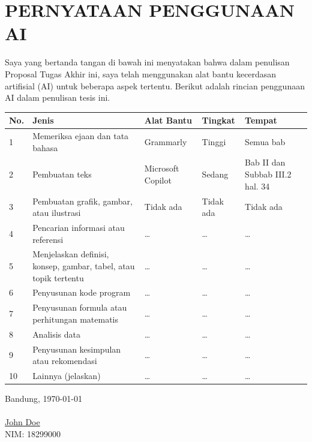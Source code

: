 \chapter*{PERNYATAAN PENGGUNAAN AI}
Saya yang bertanda tangan di bawah ini menyatakan bahwa dalam penulisan Proposal Tugas Akhir ini, saya telah menggunakan alat bantu kecerdasan artifisial (AI) untuk beberapa aspek tertentu. Berikut adalah rincian penggunaan AI dalam penulisan tesis ini.
\begin{table}[h]
\begin{tabular}{|p{0.5cm}| p{4cm} | p{2.5cm} | p{2.5cm} | p{3cm} @{}| }
\hline
\textbf{No.} & \textbf{Jenis} & \textbf{Alat Bantu} & \textbf{Tingkat} & \textbf{Tempat}\\
\hline
1 & Memeriksa ejaan dan tata bahasa & Grammarly & Tinggi & Semua bab \\
\hline
2 & Pembuatan teks & Microsoft Copilot & Sedang & Bab II dan Subbab III.2 hal. 34 \\
\hline
3 & Pembuatan grafik, gambar, atau ilustrasi & Tidak ada & Tidak ada & Tidak ada \\
\hline
4 & Pencarian informasi atau referensi & \ldots & \ldots & \ldots \\
\hline
5 & Menjelaskan definisi, konsep, gambar, tabel, atau topik tertentu  & \ldots & \ldots & \ldots \\
\hline
6 & Penyusunan kode program & \ldots & \ldots & \ldots \\
\hline
7 & Penyusunan formula atau perhitungan matematis & \ldots & \ldots & \ldots \\
\hline
8 &  Analisis data  & \ldots & \ldots & \ldots \\
\hline
9 & Penyusunan kesimpulan atau rekomendasi & \ldots & \ldots & \ldots \\
\hline
10 & Lainnya (jelaskan) & \ldots & \ldots & \ldots \\
\hline
\end{tabular}
\end{table}


Bandung, \today\\
\\[2cm]

\underline{John Doe} \\
NIM: 18299000